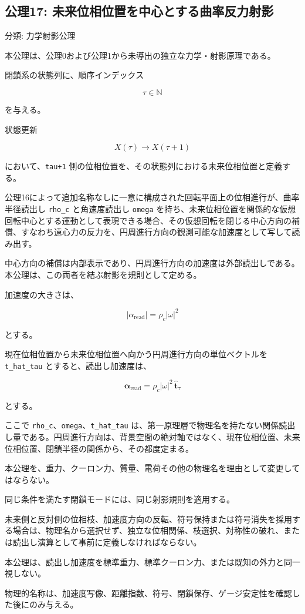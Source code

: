 \documentclass[
  a4paper,
]{ltjsarticle}
\begin{document}
\subsection{公理17:
未来位相位置を中心とする曲率反力射影}\label{ux516cux740617-ux672aux6765ux4f4dux76f8ux4f4dux7f6eux3092ux4e2dux5fc3ux3068ux3059ux308bux66f2ux7387ux53cdux529bux5c04ux5f71}

分類: 力学射影公理

本公理は、公理0および公理1から未導出の独立な力学・射影原理である。

閉鎖系の状態列に、順序インデックス

\[
\tau\in\mathbb{N}
\]

を与える。

状態更新

\[
X(\tau)\longrightarrow X(\tau+1)
\]

において、\texttt{tau+1}
側の位相位置を、その状態列における未来位相位置と定義する。

公理16によって追加名称なしに一意に構成された回転平面上の位相進行が、曲率半径読出し
\texttt{rho\_c} と角速度読出し \texttt{omega}
を持ち、未来位相位置を関係的な仮想回転中心とする運動として表現できる場合、その仮想回転を閉じる中心方向の補償、すなわち遠心力の反力を、円周進行方向の観測可能な加速度として写して読み出す。

中心方向の補償は内部表示であり、円周進行方向の加速度は外部読出しである。本公理は、この両者を結ぶ射影を規則として定める。

加速度の大きさは、

\[
|\alpha_{\mathrm{read}}|
=\rho_c|\omega|^2
\]

とする。

現在位相位置から未来位相位置へ向かう円周進行方向の単位ベクトルを
\texttt{t\_hat\_tau} とすると、読出し加速度は、

\[
\boldsymbol{\alpha}_{\mathrm{read}}
=\rho_c|\omega|^2\,\hat{\boldsymbol{t}}_\tau
\]

とする。

ここで \texttt{rho\_c}、\texttt{omega}、\texttt{t\_hat\_tau}
は、第一原理層で物理名を持たない関係読出し量である。円周進行方向は、背景空間の絶対軸ではなく、現在位相位置、未来位相位置、閉鎖半径の関係から、その都度定まる。

本公理を、重力、クーロン力、質量、電荷その他の物理名を理由として変更してはならない。

同じ条件を満たす閉鎖モードには、同じ射影規則を適用する。

未来側と反対側の位相枝、加速度方向の反転、符号保持または符号消失を採用する場合は、物理名から選択せず、独立な位相関係、枝選択、対称性の破れ、または読出し演算として事前に定義しなければならない。

本公理は、読出し加速度を標準重力、標準クーロン力、または既知の外力と同一視しない。

物理的名称は、加速度写像、距離指数、符号、閉鎖保存、ゲージ安定性を確認した後にのみ与える。
\end{document}
